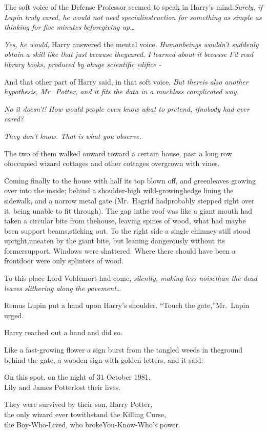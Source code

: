 The soft voice of the Defense Professor seemed to speak in Harry's mind.\emph{Surely, if Lupin truly cared, he would not need specialinstruction for something as simple as thinking for five minutes beforegiving up\ldots{}}

\emph{Yes, he would,} Harry answered the mental voice. \emph{Humanbeings wouldn't suddenly obtain a skill like that just because theycared. I learned about it because I'd read library books, produced by ahuge scientific edifice -}

And that other part of Harry said, in that soft voice, \emph{But thereis also another hypothesis, Mr.~Potter, and it fits the data in a muchless complicated way.}

\emph{No it doesn't! How would people even know what to pretend, ifnobody had ever cared?}

\emph{They don't know. That is what you observe.}

The two of them walked onward toward a certain house, past a long row ofoccupied wizard cottages and other cottages overgrown with vines.

Coming finally to the house with half its top blown off, and greenleaves growing over into the inside; behind a shoulder-high wild-growinghedge lining the sidewalk, and a narrow metal gate (Mr.~Hagrid hadprobably stepped right over it, being unable to fit through). The gap inthe roof was like a giant mouth had taken a circular bite from thehouse, leaving spines of wood, what had maybe been support beams,sticking out. To the right side a single chimney still stood upright,uneaten by the giant bite, but leaning dangerously without its formersupport. Windows were shattered. Where there should have been a frontdoor were only splinters of wood.

To this place Lord Voldemort had come, \emph{silently, making less noisethan the dead leaves slithering along the pavement\ldots{}}

Remus Lupin put a hand upon Harry's shoulder. ``Touch the gate,''Mr.~Lupin urged.

Harry reached out a hand and did so.

Like a fast-growing flower a sign burst from the tangled weeds in theground behind the gate, a wooden sign with golden letters, and it said:

On this spot, on the night of 31 October 1981,\\ Lily and James Potterlost their lives.

They were survived by their son, Harry Potter,\\ the only wizard ever towithstand the Killing Curse,\\ the Boy-Who-Lived, who brokeYou-Know-Who's power.

